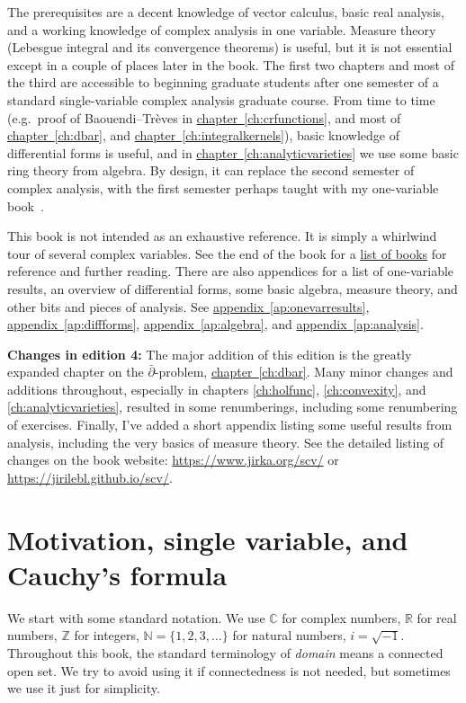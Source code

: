 \documentclass[12pt,openany]{book}
\newcommand{\C}{{\mathbb{C}}}
\newcommand{\R}{{\mathbb{R}}}
\newcommand{\Z}{{\mathbb{Z}}}
\newcommand{\N}{{\mathbb{N}}}
\newcommand{\myindex}[1]{#1\index{#1}}
\theoremstyle{plain}
\theoremstyle{remark}
\theoremstyle{definition}
\theoremstyle{exercise}
\theoremstyle{example}
\newcommand{\chapterref}[1]{\hyperref[#1]{chapter~\ref*{#1}}}
\newcommand{\appendixref}[1]{\hyperref[#1]{appendix~\ref*{#1}}}
\begin{document}
The prerequisites are a decent knowledge of vector calculus, basic
real analysis, and a working knowledge of complex analysis in one variable.
Measure theory (Lebesgue integral and its convergence theorems) is useful,
but it is not essential except in a couple of places later in the book.
The first two chapters and most of the third
are accessible to beginning graduate students after one semester
of a standard single-variable complex
analysis graduate course.
From time to time (e.g.\ proof of Baouendi--Tr\`eves in
\chapterref{ch:crfunctions},
and most of
\chapterref{ch:dbar}, and \chapterref{ch:integralkernels}),
basic knowledge of differential forms is useful, and
in \chapterref{ch:analyticvarieties}
we use some basic ring theory from algebra.
By design, it can replace the second semester of complex analysis,
with the first semester
perhaps taught with my one-variable book~\cite{Lebl:ca}.

This book is not intended as an exhaustive reference.
It is simply a whirlwind tour of several complex variables.
See the end of the book
for a \hyperref[ch:furtherreading]{list of books} for
reference and further reading.  There are also appendices for
a list of one-variable results, an overview of differential forms,
some basic algebra, measure theory, and other bits and pieces of analysis.
See \appendixref{ap:onevarresults},
\appendixref{ap:diffforms},
\appendixref{ap:algebra}, and
\appendixref{ap:analysis}.

\textbf{Changes in edition 4:}
The major addition of this edition is the greatly
expanded chapter on the
$\bar{\partial}$-problem, \chapterref{ch:dbar}.
Many minor changes and additions throughout, especially in chapters
\ref{ch:holfunc}, \ref{ch:convexity}, and \ref{ch:analyticvarieties},
resulted in some renumberings, including some renumbering of exercises.
Finally, I've added a short
appendix listing some useful results from analysis, including the very
basics of measure theory.
See the detailed listing of changes on the book website:
\url{https://www.jirka.org/scv/} or
\url{https://jirilebl.github.io/scv/}.


\section{Motivation, single variable, and Cauchy's formula} \label{sec:motivation}


We start with some standard notation.
We use $\C$ for complex numbers, $\R$
for real numbers,
$\Z$ for integers,
$\N = \{ 1,2,3,\ldots \}$ for natural
numbers,
$i = \sqrt{-1}$.  Throughout this book,
the standard terminology of \emph{\myindex{domain}} means a connected open
set.  We try to avoid using it if connectedness is not needed, but
sometimes we use it just for simplicity.
\end{document}
